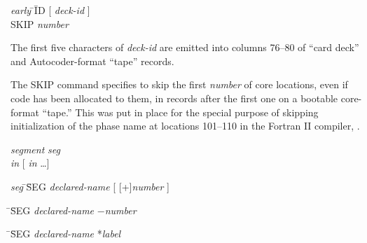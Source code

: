 \documentclass[12pt,twoside]{article}
\begin{document}
\begin{tabbing}
\emph{early} \= \pro \= ID [ \emph{deck-id} ] \\
\> \R \> SKIP \emph{number}
\end{tabbing}

The first five characters of \emph{deck-id} are emitted into columns
76--80 of ``card deck'' and Autocoder-format ``tape'' records.

The SKIP command specifies to skip the first \emph{number} of core
locations, even if code has been allocated to them, in records after the
first one on a bootable core-format ``tape.''  This was put in place for
the special purpose of skipping initialization of the phase name at
locations 101--110 in the Fortran II compiler,
.

\begin{tabbing}
\emph{segment} \pro \= \emph{seg}\\
\> \emph{in} [ \emph{in} \dots ] \\
\end{tabbing}

\begin{tabbing}
\emph{seg} \= \pro \= SEG \emph{declared-name} [ [+]\emph{number} ] \\
\end{tabbing}


\begin{tabbing}
 \= \R \= SEG \emph{declared-name} $-$\emph{number} \\
\end{tabbing}


\begin{tabbing}
 \= \R \= SEG \emph{declared-name} *\emph{label} \\
\end{tabbing}

\end{document}
